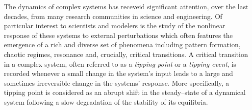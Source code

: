 The dynamics of complex systems has receveid significant attention, over the last decades, from many research communities in science and engineering.
Of particular interest to scientists and modelers is the study of the nonlinear response of these systems to external perturbations which often features the emergence of a rich and diverse set of phenomena including pattern formation, chaotic regimes, resonance and, crucially, critical transitions.
A critical transition in a complex system, often referred to as a \emph{tipping point} or a \emph{tipping event}, is recorded whenever a small change in the system's input leads to a large and sometimes irreversible change in the systems' response.
More specifically, a tipping point is considered as an abrupt shift in the steady--state of a dynamical system following a slow degradation of the stability of its equilibria.

